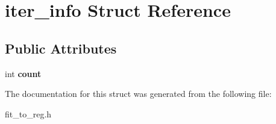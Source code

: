 \hypertarget{structiter__info}{}\section{iter\+\_\+info Struct Reference}
\label{structiter__info}
\subsection*{Public Attributes}
\begin{DoxyCompactItemize}
\item 
int {\bfseries count}\hypertarget{structiter__info_ae3593975d05f80f5182d2b5b48ef20ee}{}\label{structiter__info_ae3593975d05f80f5182d2b5b48ef20ee}

\end{DoxyCompactItemize}


The documentation for this struct was generated from the following file\+:\begin{DoxyCompactItemize}
\item 
fit\+\_\+to\+\_\+reg.\+h\end{DoxyCompactItemize}
